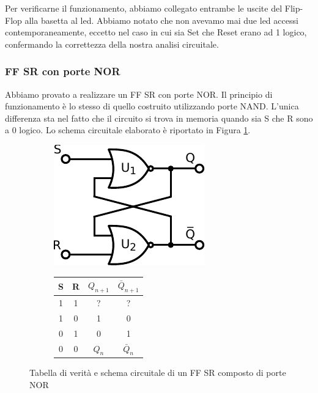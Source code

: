 Per verificarne il funzionamento, abbiamo collegato entrambe le uscite del Flip-Flop alla basetta al led.
Abbiamo notato che non avevamo mai due led accessi contemporaneamente, eccetto nel caso in cui sia Set che Reset erano ad 1 logico, confermando la correttezza della nostra analisi circuitale.

\subsubsection*{FF SR con porte NOR}

Abbiamo provato a realizzare un FF SR con porte NOR.
Il principio di funzionamento è lo stesso di quello costruito utilizzando porte NAND.
L'unica differenza sta nel fatto che il circuito si trova in memoria quando sia S che R sono a 0 logico.
Lo schema circuitale elaborato è riportato in Figura \ref{cir11:nor}.

\begin{figure}[htpc]
\centering
        \begin{subfigure}[hc]{.5\textwidth}
		\centering
		\includegraphics[width=.35\textwidth]{../E11/latex/FF-w-NOR.pdf}
		\caption{}
		\label{cir11:nor}
        \end{subfigure}
	\begin{subfigure}[hc]{.4\textwidth}
		\centering
		{\renewcommand{\arraystretch}{1.1}%
		\begin{tabular}{|c|c|c|c|}
		\hline
		S & R & $Q_{n+1}$ & $\bar Q_{n+1}$  \\
		\hline
		1 & 1  & ?&?\\
		\hline
		1&0 & 1 & 0\\
		\hline
		0&1 & 0  &1\\
		\hline
		0&0 & $Q_n$ & $\bar Q_n$\\
		\hline
		\end{tabular}}
		\caption{}
		\label{tab11:nor}
        \end{subfigure}
\caption{Tabella di verità e schema circuitale di un FF SR composto di porte NOR}
\end{figure}


